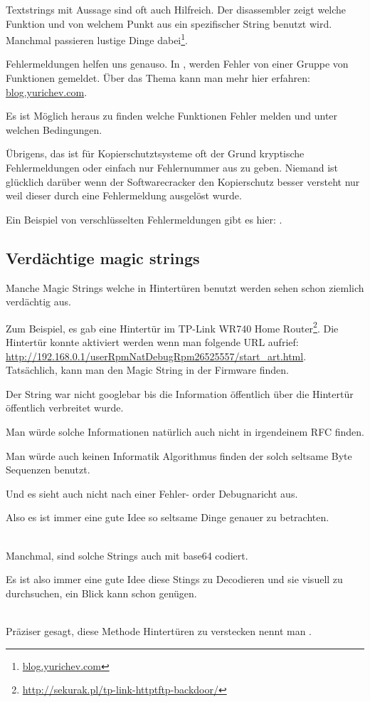 Textstrings mit Aussage sind oft auch Hilfreich. %
Der \IDA disassembler zeigt welche Funktion und von welchem Punkt aus ein spezifischer String benutzt wird.
Manchmal passieren lustige Dinge dabei\footnote{\href{http://go.yurichev.com/17223}{blog.yurichev.com}}.

Fehlermeldungen helfen uns genauso.
In \oracle, werden Fehler von einer Gruppe von Funktionen gemeldet.
Über das Thema kann man mehr hier erfahren: \href{http://go.yurichev.com/17224}{blog.yurichev.com}.


Es ist Möglich heraus zu finden welche Funktionen Fehler melden und unter welchen Bedingungen.


Übrigens, das ist für Kopierschutztsysteme oft der Grund kryptische Fehlermeldungen oder einfach nur 
Fehlernummer aus zu geben. Niemand ist glücklich darüber wenn der Softwarecracker den Kopierschutz besser
versteht nur weil dieser durch eine Fehlermeldung ausgelöst wurde.

Ein Beispiel von verschlüsselten Fehlermeldungen gibt es hier: .

\subsection{Verdächtige magic strings}

Manche Magic Strings welche in Hintertüren benutzt werden sehen schon ziemlich verdächtig aus.


Zum Beispiel, es gab eine Hintertür im TP-Link WR740 Home Router\footnote{\url{http://sekurak.pl/tp-link-httptftp-backdoor/}}.
Die Hintertür konnte aktiviert werden wenn man folgende URL aufrief:
\url{http://192.168.0.1/userRpmNatDebugRpm26525557/start_art.html}.\\

Tatsächlich, kann man den Magic String  in der Firmware finden.

Der String war nicht googlebar bis die Information öffentlich über die Hintertür öffentlich verbreitet wurde.


Man würde solche Informationen natürlich auch nicht in irgendeinem \ac{RFC} finden.


Man würde auch keinen Informatik Algorithmus finden der solch seltsame Byte Sequenzen benutzt.


Und es sieht auch nicht nach einer Fehler- order Debugnaricht aus.


Also es ist immer eine gute Idee so seltsame Dinge genauer zu betrachten.\\
\\

Manchmal, sind solche Strings auch mit base64 codiert.

Es ist also immer eine gute Idee diese Stings zu Decodieren und sie visuell zu durchsuchen, ein Blick
kann schon genügen.

\\
Präziser gesagt, diese Methode Hintertüren zu verstecken nennt man .
